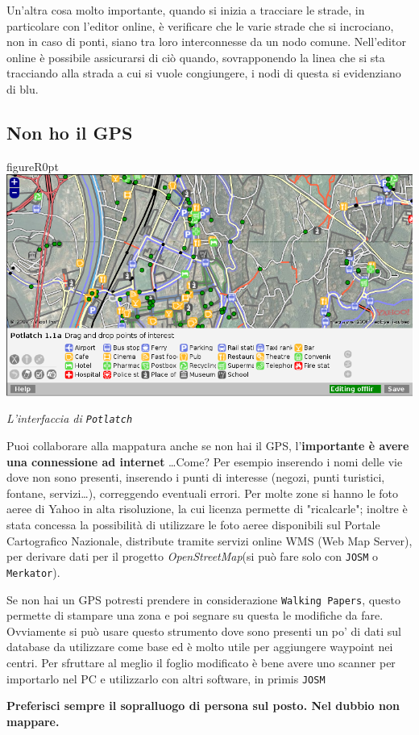 \documentclass[a4paper,twoside,12pt,]{article}
\newcommand{\osm}{\emph{OpenStreetMap}\xspace}
\newcommand{\gps}{GPS\xspace}
\newcommand{\soft}[1]{\texttt{#1}}
\begin{document}
Un'altra cosa molto importante, quando si inizia a tracciare le strade, in particolare con l'editor online, è verificare che le varie strade che si incrociano, non in caso di ponti, siano tra loro interconnesse da un nodo comune. Nell'editor online è possibile assicurarsi di ciò quando, sovrapponendo la linea che si sta tracciando alla strada a cui si vuole congiungere, i nodi di questa si evidenziano di blu.
\subsection{Non ho il \gps}
\begin{wrapfloat}{figure}{R}{0pt}
 \includegraphics[width=0.7\columnwidth]{potlatch.png}
 \caption{\textit{L'interfaccia di \soft{Potlatch}}}
\end{wrapfloat}
Puoi collaborare alla mappatura anche se non hai il \gps, l'\textbf{importante è avere una connessione ad internet} \dots Come? Per esempio inserendo i nomi delle vie dove non sono presenti, inserendo i punti di interesse (negozi, punti turistici, fontane, servizi\dots), correggendo eventuali errori. Per molte zone si hanno le foto aeree di Yahoo in alta risoluzione, la cui licenza permette di "ricalcarle"; inoltre è stata concessa la possibilità di utilizzare le foto aeree disponibili sul Portale Cartografico Nazionale, distribute tramite servizi online WMS (Web Map Server), per derivare dati per il progetto \osm (si può fare solo con \soft{JOSM} o \soft{Merkator}). 

Se non hai un \gps potresti prendere in considerazione \soft{Walking Papers}, questo permette di stampare una zona e poi segnare su questa le modifiche da fare. Ovviamente si può usare questo strumento dove sono presenti un po' di dati sul database da utilizzare come base ed è molto utile per aggiungere waypoint nei centri. Per sfruttare al meglio il foglio modificato è bene avere uno scanner per importarlo nel PC e utilizzarlo con altri software, in primis \soft{JOSM}

\textbf{Preferisci sempre il sopralluogo di persona sul posto. Nel dubbio non mappare.}
\end{document}
